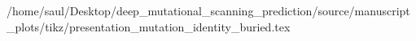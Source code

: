 /home/saul/Desktop/deep_mutational_scanning_prediction/source/manuscript_plots/tikz/presentation_mutation_identity_buried.tex